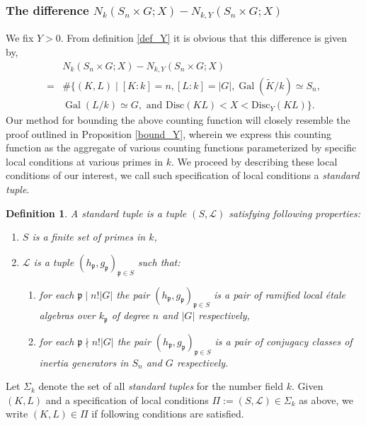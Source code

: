 \documentclass[11pt]{amsart}
\newtheorem{definition}[theorem]{Definition}
\newcommand{\fp}{\mathfrak{p}}
\newcommand{\disc}{\mathrm{Disc}}
\newcommand{\op}[1]{\operatorname{#1}}
\numberwithin{equation}{section}
\begin{document}
\subsubsection{The difference $N_k(S_n\times G; X) - N_{k,Y}(S_n\times G; X)$}
We fix $Y > 0$. From definition \ref{def_Y} it is obvious that this difference is given by,
\begin{equation}
\begin{split}
        & N_k(S_n\times G; X) - N_{k,Y}(S_n\times G; X) \\
        =& \#\{(K,L)\mid  [K:k]= n, [L:k] = |G|, \op{Gal}(\widetilde{K}/k) \simeq S_n,\\ 
        & \op{Gal}(L/k) \simeq G,
         \text{ and } \disc(KL) < X < \disc_Y(KL)\}.
\end{split}
\end{equation}
Our method for bounding the above counting function will closely resemble the proof outlined in Proposition \ref{bound_Y}, wherein we express this counting function as the aggregate of various counting functions parameterized by specific local conditions at various primes in $k$. We proceed by describing these local conditions of our interest, we call such specification of local conditions a \textit{standard tuple}.
\begin{definition}\label{sd tuple}
    A \textit{standard tuple} is a tuple $(S,\mathcal{L})$ satisfying following properties:
    \begin{enumerate}
        \item $S$ is a finite set of primes in $k$,
        \item $\mathcal{L}$ is a tuple $(h_{\fp}, g_{\fp})_{\fp\in S}$ such that:
        \begin{enumerate}
            \item for each $\fp \mid n!|G|$ the pair $(h_{\fp}, g_{\fp})_{\fp\in S}$ is a pair of ramified local étale algebras over $k_{\fp}$ of degree $n$ and $|G|$ respectively,
            \item for each $\fp \nmid n!|G|$ the pair $(h_{\fp}, g_{\fp})_{\fp\in S}$ is a pair of conjugacy classes of inertia generators in $S_n$ and $G$ respectively.
        \end{enumerate}
    \end{enumerate}
\end{definition}
Let $\Sigma_k$ denote the set of all \textit{standard tuples} for the number field $k$. Given $(K,L)$ and a specification of local conditions $\Pi:= (S,\mathcal{L}) \in \Sigma_k$ as above, we write $(K,L) \in \Pi$ if following conditions are satisfied.
\end{document}
